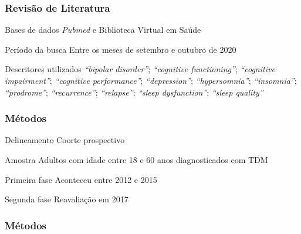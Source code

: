 \documentclass{beamer}
\begin{document}
\begin{frame}
    \frametitle{Revisão de Literatura}

    \begin{block}{Bases de dados}
        \emph{Pubmed} e Biblioteca Virtual em Saúde
    \end{block}

    \begin{block}{Período da busca}
        Entre os meses de setembro e outubro de 2020
    \end{block}

    \begin{block}{Descritores utilizados}
        \textit{``bipolar disorder''};
        \textit{``cognitive functioning''}; \textit{``cognitive impairment''};
        \textit{``cognitive performance''}; \textit{``depression''};
        \textit{``hypersomnia''}; \textit{``insomnia''}; \textit{``prodrome''};
        \textit{``recurrence''}; \textit{``relapse''}; \textit{``sleep dysfunction''};
        \textit{``sleep quality''}
    \end{block}

\end{frame}

\begin{frame}
\frametitle{Métodos}

    \begin{block}{Delineamento}
        Coorte prospectivo
    \end{block}

    \begin{block}{Amostra}
        Adultos com idade entre 18 e 60 anos diagnosticados com TDM
    \end{block}

    \begin{block}{Primeira fase}
        Aconteceu entre 2012 e 2015
    \end{block}

    \begin{block}{Segunda fase}
        Reavaliação em 2017
    \end{block}

\end{frame}

\begin{frame}
\frametitle{Métodos}


    \centering

\end{frame}
\end{document}

